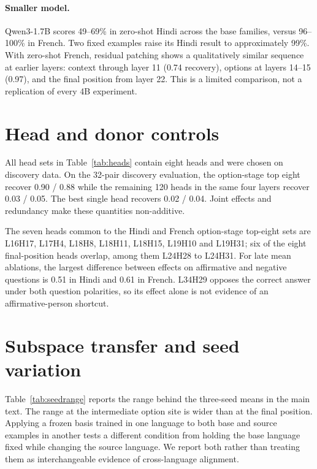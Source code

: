 \documentclass[11pt]{article}
\begin{document}
\paragraph{Smaller model.} Qwen3-1.7B scores 49--69\% in zero-shot Hindi across the base families, versus 96--100\% in French. Two fixed examples raise its Hindi result to approximately 99\%. With zero-shot French, residual patching shows a qualitatively similar sequence at earlier layers: context through layer 11 (0.74 recovery), options at layers 14--15 (0.97), and the final position from layer 22. This is a limited comparison, not a replication of every 4B experiment.

\section{Head and donor controls}
\label{app:heads}
All head sets in Table~\ref{tab:heads} contain eight heads and were chosen on discovery data. On the 32-pair discovery evaluation, the option-stage top eight recover 0.90 / 0.88 while the remaining 120 heads in the same four layers recover 0.03 / 0.05. The best single head recovers 0.02 / 0.04. Joint effects and redundancy make these quantities non-additive.

The seven heads common to the Hindi and French option-stage top-eight sets are L16H17, L17H4, L18H8, L18H11, L18H15, L19H10 and L19H31; six of the eight final-position heads overlap, among them L24H28 to L24H31. For late mean ablations, the largest difference between effects on affirmative and negative questions is 0.51 in Hindi and 0.61 in French. L34H29 opposes the correct answer under both question polarities, so its effect alone is not evidence of an affirmative-person shortcut.

\section{Subspace transfer and seed variation}
\label{app:das}
Table~\ref{tab:seedrange} reports the range behind the three-seed means in the main text. The range at the intermediate option site is wider than at the final position. Applying a frozen basis trained in one language to both base and source examples in another tests a different condition from holding the base language fixed while changing the source language. We report both rather than treating them as interchangeable evidence of cross-language alignment.
\end{document}
